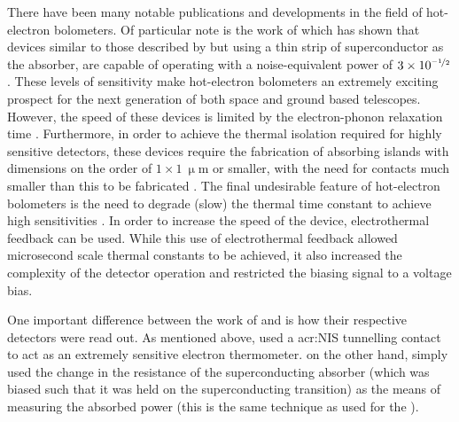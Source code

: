 There have been many notable publications and developments in the field of hot-electron bolometers. Of particular note is the work of \citeauthor{Karasik2011} which has shown that devices similar to those described by \citeauthor{Nahum1993} but using a thin strip of superconductor as the absorber, are capable of operating with a noise-equivalent power of $3 \times 10^{\nicefrac{-1}{2}}$ \parencite{Karasik2007,Karasik2011}. These levels of sensitivity make hot-electron bolometers an extremely exciting prospect for the next generation of both space and ground based telescopes. However, the speed of these devices is limited by the electron-phonon relaxation time \parencite[][reports a time constant of $30~\mathrm{\upmu s}$]{Karasik2007}. Furthermore, in order to achieve the thermal isolation required for highly sensitive detectors, these devices require the fabrication of absorbing islands with dimensions on the order of $1 \times 1~\mathrm{\upmu m}$ or smaller, with the need for contacts much smaller than this to be fabricated \parencite{Karasik2011}. The final undesirable feature of hot-electron bolometers is the need to degrade (slow) the thermal time constant to achieve high sensitivities \parencite{Karasik2000}. In order to increase the speed of the device, electrothermal feedback \parencite[as described by][]{Irwin1995} can be used. While this use of electrothermal feedback allowed microsecond scale thermal constants to be achieved, it also increased the complexity of the detector operation and restricted the biasing signal to a voltage bias. 
\par 
One important difference between the work of \citeauthor{Nahum1993} and \citeauthor{Karasik2000} is how their respective detectors were read out. As mentioned above, \citeauthor{Nahum1993} used a \gls{acr:NIS} tunnelling contact to act as an extremely sensitive electron thermometer. \citeauthor{Karasik2000} on the other hand, simply used the change in the resistance of the superconducting absorber (which was biased such that it was held on the superconducting transition) as the means of measuring the absorbed power (this is the same technique as used for the ).
\par 
